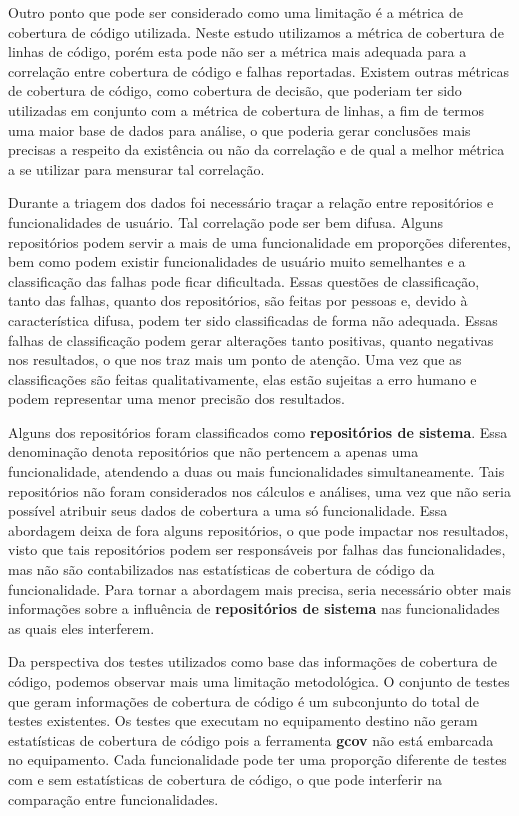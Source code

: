 \documentclass[11.5pt]{article}
\begin{document}
Outro ponto que pode ser considerado como uma limitação é a métrica de cobertura de código
utilizada.
Neste estudo utilizamos a métrica de cobertura de linhas de código, porém esta pode não ser a
métrica mais adequada para a correlação entre cobertura de código e falhas reportadas.
Existem outras métricas de cobertura de código, como cobertura de decisão, que poderiam ter sido
utilizadas em conjunto com a métrica de cobertura de linhas, a fim de termos uma maior base de dados
para análise, o que poderia gerar conclusões mais precisas a respeito da existência ou não da
correlação e de qual a melhor métrica a se utilizar para mensurar tal correlação.

Durante a triagem dos dados foi necessário traçar a relação entre repositórios e funcionalidades
de usuário.
Tal correlação pode ser bem difusa.
Alguns repositórios podem servir a mais de uma funcionalidade em proporções diferentes, bem como
podem existir funcionalidades de usuário muito semelhantes e a classificação das falhas pode ficar
dificultada.
Essas questões de classificação, tanto das falhas, quanto dos repositórios, são feitas por pessoas
e, devido à característica difusa, podem ter sido classificadas de forma não adequada.
Essas falhas de classificação podem gerar alterações tanto positivas, quanto negativas nos
resultados, o que nos traz mais um ponto de atenção.
Uma vez que as classificações são feitas qualitativamente, elas estão sujeitas a erro humano e podem
representar uma menor precisão dos resultados.

Alguns dos repositórios foram classificados como \textbf{repositórios de sistema}.
Essa denominação denota repositórios que não pertencem a apenas uma funcionalidade, atendendo a duas
ou mais funcionalidades simultaneamente.
Tais repositórios não foram considerados nos cálculos e análises, uma vez que não seria possível
atribuir seus dados de cobertura a uma só funcionalidade.
Essa abordagem deixa de fora alguns repositórios, o que pode impactar nos resultados, visto que tais
repositórios podem ser responsáveis por falhas das funcionalidades, mas não são contabilizados nas
estatísticas de cobertura de código da funcionalidade.
Para tornar a abordagem mais precisa, seria necessário obter mais informações sobre a influência
de \textbf{repositórios de sistema} nas funcionalidades as quais eles interferem.

Da perspectiva dos testes utilizados como base das informações de cobertura de código, podemos
observar mais uma limitação metodológica.
O conjunto de testes que geram informações de cobertura de código é um subconjunto do total de
testes existentes.
Os testes que executam no equipamento destino não geram estatísticas de cobertura de código pois
a ferramenta \textbf{gcov} não está embarcada no equipamento.
Cada funcionalidade pode ter uma proporção diferente de testes com e sem estatísticas de cobertura
de código, o que pode interferir na comparação entre funcionalidades.
\end{document}

